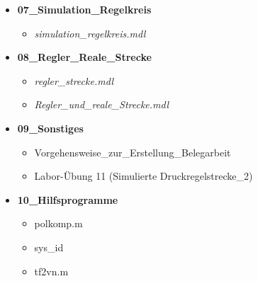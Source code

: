 \documentclass[11pt, a4paper,parskip=half]{article}
\begin{document}
\begin{itemize}
\item \textbf{07\_Simulation\_Regelkreis}
	\begin{itemize}
	\item \textit{simulation\_regelkreis.mdl}
	\end{itemize}
	
\item \textbf{08\_Regler\_Reale\_Strecke}
	\begin{itemize}
	\item \textit{regler\_strecke.mdl}
	\item \textit{Regler\_und\_reale\_Strecke.mdl}
	\end{itemize}
	
\item \textbf{09\_Sonstiges}
	\begin{itemize}
	\item Vorgehensweise\_zur\_Erstellung\_Belegarbeit
	\item Labor-Übung 11 (Simulierte Druckregelstrecke\_2)
	\end{itemize}
	
\item \textbf{10\_Hilfsprogramme}
	\begin{itemize}
	\item polkomp.m
	\item sys\_id
	\item tf2vn.m
	\end{itemize}

\end{itemize}





\newpage
\tableofcontents %




\newpage
\listoffigures
		
%  




\clearpage
\newpage
{}
\nocite{*}


\end{document}
